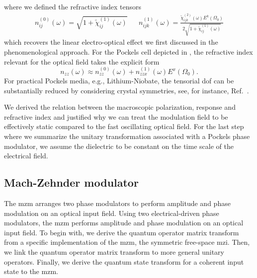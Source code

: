 where we defined the refractive index tensors
\begin{align}
	n^{(0)}_{ij}(\omega)
	=
	\sqrt{1+\tilde{\chi}^{(1)}_{ij}(\omega)}
	&&
	n^{(1)}_{ijk}(\omega)
	=
	\frac{\tilde{\chi}^{(2)}_{ijk}(\omega)
	E^k(\Omega_0)}{2\sqrt{1+\tilde{\chi}^{(1)}_{ij}(\omega)}}
\end{align}
which recovers the linear electro-optical effect we first discussed in the phenomenological approach.
For the Pockels cell depicted in , the refractive index relevant for the optical field takes the explicit form
\begin{equation}
	n_{zz}(\omega)
	\approx
	n^{(0)}_{zz}(\omega)
	+
	n^{(1)}_{zzx}(\omega)
	E^x(\Omega_0)
	.
\end{equation}
For practical Pockels media, e.g., Lithium-Niobate, the tensorial \gls{dof} can be substantially reduced by considering crystal symmetries, see, for instance, Ref.~\cite[p.~237]{Yariv1984}.

We derived the relation between the macroscopic polarization, response and refractive index and justified why we can treat the modulation field to be effectively static compared to the fast oscillating optical field.
For the last step where we summarize the unitary transformation associated with a Pockels phase modulator, we assume the dielectric to be constant on the time scale of the electrical field.

\subsection{Mach-Zehnder modulator}

The \gls{mzm} arranges two phase modulators to perform amplitude and phase modulation on an optical input field.
Using two electrical-driven phase modulators, the \gls{mzm} performs amplitude and phase modulation on an optical input field.
To begin with, we derive the quantum operator matrix transform from a specific implementation of the \gls{mzm}, the symmetric free-space \gls{mzi}.
Then, we link the quantum operator matrix transform to more general unitary operators.
Finally, we derive the quantum state transform for a coherent input state to the \gls{mzm}.

